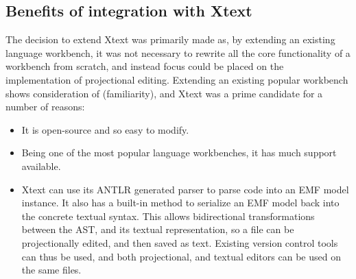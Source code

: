 \documentclass{article}
\begin{document}
\subsection{Benefits of integration with Xtext}\label{integrationWithXtext}
The decision to extend Xtext was primarily made as, by extending an existing language workbench, it was not necessary to rewrite all the core functionality of a workbench from scratch, and instead focus could be placed on the implementation of projectional editing. Extending an existing popular workbench shows consideration of \RFamiliarity (familiarity), and Xtext was a prime candidate for a number of reasons:
\begin{itemize}
\item It is open-source and so easy to modify.
\item Being one of the most popular language workbenches, it has much support available.
\item Xtext can use its ANTLR generated parser to parse code into an EMF model instance. It also has a built-in method to serialize an EMF model back into the concrete textual syntax. This allows bidirectional transformations between the AST, and its textual representation, so a file can be projectionally edited, and then saved as text. Existing version control tools can thus be used, and both projectional, and textual editors can be used on the same files.
\end{itemize}
\end{document}
